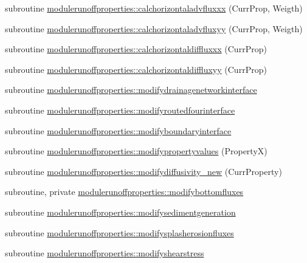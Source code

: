 \begin{DoxyCompactItemize}
subroutine \mbox{\hyperlink{namespacemodulerunoffproperties_a23224aa9dab3db29383ab466a5695a17}{modulerunoffproperties\+::calchorizontaladvfluxxx}} (Curr\+Prop, Weigth)
\item 
subroutine \mbox{\hyperlink{namespacemodulerunoffproperties_a9d3bb361bae08dcb2b84d831a49712be}{modulerunoffproperties\+::calchorizontaladvfluxyy}} (Curr\+Prop, Weigth)
\item 
subroutine \mbox{\hyperlink{namespacemodulerunoffproperties_a296ba41d998d7fe4223d8d224ba9c0ba}{modulerunoffproperties\+::calchorizontaldiffluxxx}} (Curr\+Prop)
\item 
subroutine \mbox{\hyperlink{namespacemodulerunoffproperties_af55b2182548c087b1f254c0a7fe61904}{modulerunoffproperties\+::calchorizontaldiffluxyy}} (Curr\+Prop)
\item 
subroutine \mbox{\hyperlink{namespacemodulerunoffproperties_af923d884ffbf9570877d94db798722ef}{modulerunoffproperties\+::modifydrainagenetworkinterface}}
\item 
subroutine \mbox{\hyperlink{namespacemodulerunoffproperties_ac6419261cb4a595997e6f2b480bd1b27}{modulerunoffproperties\+::modifyroutedfourinterface}}
\item 
subroutine \mbox{\hyperlink{namespacemodulerunoffproperties_abb21b8b2577c08fe41a7a41e186272d5}{modulerunoffproperties\+::modifyboundaryinterface}}
\item 
subroutine \mbox{\hyperlink{namespacemodulerunoffproperties_ad0713aee47ec52341e436c46ac2a4fd6}{modulerunoffproperties\+::modifypropertyvalues}} (PropertyX)
\item 
subroutine \mbox{\hyperlink{namespacemodulerunoffproperties_abb384a4ec2ef0d9cc812459889ee8063}{modulerunoffproperties\+::modifydiffusivity\+\_\+new}} (Curr\+Property)
\item 
subroutine, private \mbox{\hyperlink{namespacemodulerunoffproperties_a2c67e89cd73897e22e4941c034891418}{modulerunoffproperties\+::modifybottomfluxes}}
\item 
subroutine \mbox{\hyperlink{namespacemodulerunoffproperties_a0edf1338341bbf4f8702def7a1f71c32}{modulerunoffproperties\+::modifysedimentgeneration}}
\item 
subroutine \mbox{\hyperlink{namespacemodulerunoffproperties_a9ac3ca2c6f3cf83428d37c39365ba1ec}{modulerunoffproperties\+::modifysplasherosionfluxes}}
\item 
subroutine \mbox{\hyperlink{namespacemodulerunoffproperties_aab15f42e0b7672bdfdff651ff710415c}{modulerunoffproperties\+::modifyshearstress}}
\item 

\end{DoxyCompactItemize}
